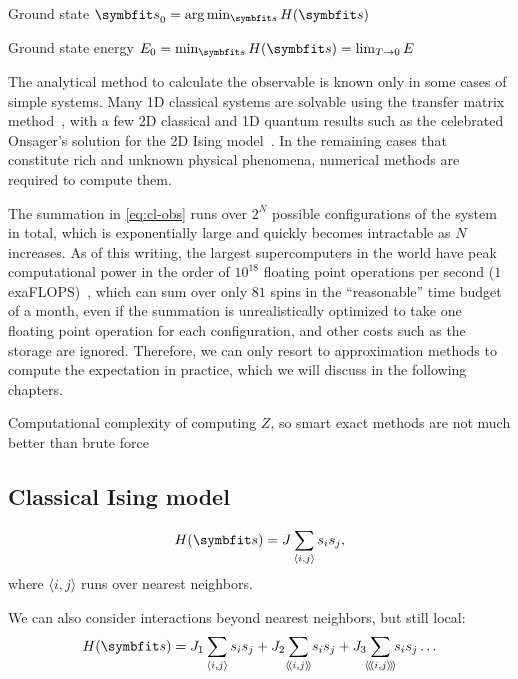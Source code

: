 Ground state $\vs_0 = \arg\min_\vs H(\vs)$

Ground state energy $E_0 = \min_\vs H(\vs) = \lim_{T \to 0} E$

The analytical method to calculate the observable is known only in some cases of simple systems. Many 1D classical systems are solvable using the transfer matrix method~\cite{chaikin1995principles5}, with a few 2D classical and 1D quantum results such as the celebrated Onsager's solution for the 2D Ising model~\cite{onsager1944crystal, baxter1995solvable,march2016exactly, caravelli2022some}. In the remaining cases that constitute rich and unknown physical phenomena, numerical methods are required to compute them.

The summation in \cref{eq:cl-obs} runs over $2^N$ possible configurations of the system in total, which is exponentially large and quickly becomes intractable as $N$ increases. As of this writing, the largest supercomputers in the world have peak computational power in the order of $10^{18}$ floating point operations per second ($1$ exaFLOPS)~\cite{kogge2022frontier}, which can sum over only $81$ spins in the ``reasonable'' time budget of a month, even if the summation is unrealistically optimized to take one floating point operation for each configuration, and other costs such as the storage are ignored. Therefore, we can only resort to approximation methods to compute the expectation in practice, which we will discuss in the following chapters.

Computational complexity of computing $Z$, so smart exact methods are not much better than brute force

\subsection{Classical Ising model}

\begin{equation}
H(\vs) = J \sum_{\langle i, j \rangle} s_i s_j,
\label{eq:cl-ising}
\end{equation}
where $\langle i, j \rangle$ runs over nearest neighbors.

We can also consider interactions beyond nearest neighbors, but still local:
\begin{equation}
H(\vs) = J_1 \sum_{\langle i, j \rangle} s_i s_j + J_2\!\sum_{\llangle i, j \rrangle}\!s_i s_j + J_3\!\!\sum_{\langle\!\langle\!\langle i, j \rangle\!\rangle\!\rangle}\!\!s_i s_j \ldots
\label{eq:cl-ising-nnn}
\end{equation}

